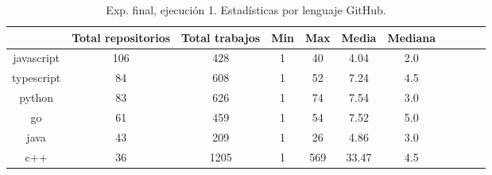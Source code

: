 \begin{table}
  \centering
  \caption{Exp. final, ejecución 1. Estadísticas por lenguaje GitHub.}
  \label{tab:tabla_f1_4}

\begin{footnotesize}
\renewcommand{\arraystretch}{1.5} %
\begin{tabular}{ccccccccccc}
  \hline
  {} &  Total repositorios &  Total trabajos &  Min &  Max &  Media &  Mediana \\
  \hline
  javascript       &        106 &         428 &    1 &   40 &   4.04 &      2.0 \\
  typescript       &         84 &         608 &    1 &   52 &   7.24 &      4.5 \\
  python           &         83 &         626 &    1 &   74 &   7.54 &      3.0 \\
  go               &         61 &         459 &    1 &   54 &   7.52 &      5.0 \\
  java             &         43 &         209 &    1 &   26 &   4.86 &      3.0 \\
  c++              &         36 &        1205 &    1 &  569 &  33.47 &      4.5 \\

\end{tabular}
\end{footnotesize}
\end{table}
